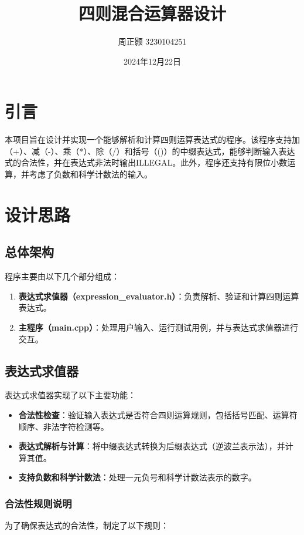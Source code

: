\documentclass{article}
\title{四则混合运算器设计}
\author{周正颢 3230104251}
\date{2024年12月22日}
\begin{document}
    \maketitle

    \section{引言}
    本项目旨在设计并实现一个能够解析和计算四则运算表达式的程序。该程序支持加（+）、减（-）、乘（*）、除（/）和括号（()）的中缀表达式，能够判断输入表达式的合法性，并在表达式非法时输出ILLEGAL。此外，程序还支持有限位小数运算，并考虑了负数和科学计数法的输入。

    \section{设计思路}
    \subsection{总体架构}
    程序主要由以下几个部分组成：
    \begin{enumerate}
        \item \textbf{表达式求值器（expression\_evaluator.h）}：负责解析、验证和计算四则运算表达式。
        \item \textbf{主程序（main.cpp）}：处理用户输入、运行测试用例，并与表达式求值器进行交互。
    \end{enumerate}



    \subsection{表达式求值器}
    表达式求值器实现了以下主要功能：
    \begin{itemize}
        \item \textbf{合法性检查}：验证输入表达式是否符合四则运算规则，包括括号匹配、运算符顺序、非法字符检测等。
        \item \textbf{表达式解析与计算}：将中缀表达式转换为后缀表达式（逆波兰表示法），并计算其值。
        \item \textbf{支持负数和科学计数法}：处理一元负号和科学计数法表示的数字。
    \end{itemize}


\subsubsection{合法性规则说明}
为了确保表达式的合法性，制定了以下规则：
\end{document}
